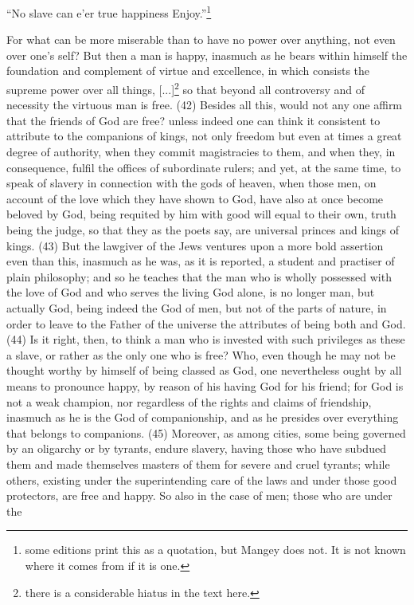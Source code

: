 ``No slave can e'er true happiness Enjoy.''\footnote{some editions print this as a quotation, but Mangey does not. It is
not known where it comes from if it is one.}

For what can be more miserable than to have no power over anything, not even over one's self?
But then a man is happy, inasmuch as he bears within himself the foundation and complement of
virtue and excellence, in which consists the supreme power over all things, [...]\footnote{there is a
considerable hiatus in the text here.} so that beyond all controversy and of necessity the virtuous man is
free. (42) Besides all this, would not any one affirm that the friends of God are free? unless indeed
one can think it consistent to attribute to the companions of kings, not only freedom but even at
times a great degree of authority, when they commit magistracies to them, and when they, in
consequence, fulfil the offices of subordinate rulers; and yet, at the same time, to speak of slavery
in connection with the gods of heaven, when those men, on account of the love which they have
shown to God, have also at once become beloved by God, being requited by him with good will
equal to their own, truth being the judge, so that they as the poets say, are universal princes and
kings of kings. (43) But the lawgiver of the Jews ventures upon a more bold assertion even than
this, inasmuch as he was, as it is reported, a student and practiser of plain philosophy; and so he
teaches that the man who is wholly possessed with the love of God and who serves the living God
alone, is no longer man, but actually God, being indeed the God of men, but not of the parts of
nature, in order to leave to the Father of the universe the attributes of being both and God. (44) Is
it right, then, to think a man who is invested with such privileges as these a slave, or rather as the
only one who is free? Who, even though he may not be thought worthy by himself of being classed
as God, one nevertheless ought by all means to pronounce happy, by reason of his having God for
his friend; for God is not a weak champion, nor regardless of the rights and claims of friendship,
inasmuch as he is the God of companionship, and as he presides over everything that belongs to
companions. (45) Moreover, as among cities, some being governed by an oligarchy or by tyrants,
endure slavery, having those who have subdued them and made themselves masters of them for
severe and cruel tyrants; while others, existing under the superintending care of the laws and under
those good protectors, are free and happy. So also in the case of men; those who are under the
